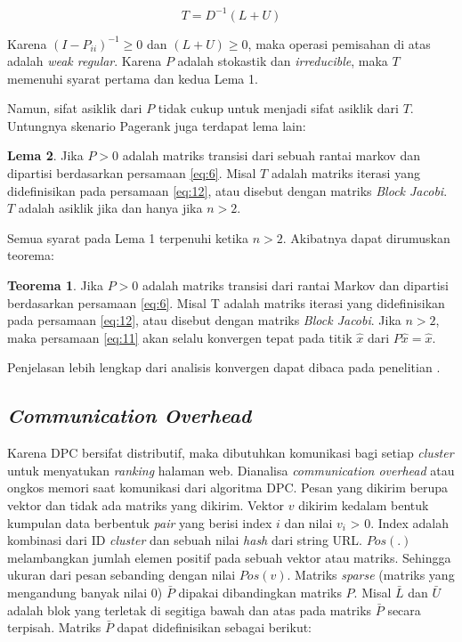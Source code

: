 \begin{equation}
	\label{eq:12}
	T = D^{-1}(L+U)
\end{equation}

Karena $(I - P_{ii})^{-1} \geq 0$ dan $(L + U) \geq 0$, maka operasi pemisahan di atas adalah \textit{weak regular}. Karena $P$ adalah stokastik dan \textit{irreducible}, maka $T$ memenuhi syarat pertama dan kedua Lema 1.

Namun, sifat asiklik dari $P$ tidak cukup untuk menjadi sifat asiklik dari $T$. Untungnya skenario Pagerank juga terdapat lema lain:

\textbf{Lema 2}. Jika $P > 0$ adalah matriks transisi dari sebuah rantai markov dan dipartisi berdasarkan persamaan \ref{eq:6}. Misal $T$ adalah matriks iterasi yang didefinisikan pada persamaan \ref{eq:12}, atau disebut dengan matriks \textit{Block Jacobi}. $T$ adalah asiklik jika dan hanya jika $n > 2$.

Semua syarat pada Lema 1 terpenuhi ketika $n > 2$. Akibatnya dapat dirumuskan teorema:

\textbf{Teorema 1}. Jika $P > 0$ adalah matriks transisi dari rantai Markov dan dipartisi berdasarkan persamaan \ref{eq:6}. Misal T adalah matriks iterasi yang didefinisikan pada persamaan \ref{eq:12}, atau disebut dengan matriks \textit{Block Jacobi}. Jika $n > 2$, maka persamaan \ref{eq:11} akan selalu konvergen tepat pada titik $\hat{x}$ dari $P\hat{x} = \hat{x}$. 

Penjelasan lebih lengkap dari analisis konvergen dapat dibaca pada penelitian \citet{zhuetal2005distributedPagerank}.

\subsection{\textit{Communication Overhead}}

Karena DPC bersifat distributif, maka dibutuhkan komunikasi bagi setiap \textit{cluster} untuk menyatukan \textit{ranking} halaman web. Dianalisa \textit{communication overhead} atau ongkos memori saat komunikasi dari algoritma DPC. Pesan yang dikirim berupa vektor dan tidak ada matriks yang dikirim. Vektor $v$ dikirim kedalam bentuk kumpulan data berbentuk \textit{pair} yang berisi index $i$ dan nilai $v_i$ > 0. Index adalah kombinasi dari ID \textit{cluster} dan sebuah nilai \textit{hash} dari string URL. $Pos(.)$ melambangkan jumlah elemen positif pada sebuah vektor atau matriks. Sehingga ukuran dari pesan sebanding dengan nilai $Pos(v)$. Matriks \textit{sparse} (matriks yang mengandung banyak nilai 0) $\bar{P}$ dipakai dibandingkan matriks $P$. Misal $\bar{L}$ dan $\bar{U}$ adalah blok yang terletak di segitiga bawah dan atas pada matriks $\bar{P}$ secara terpisah. Matriks $\bar{P}$ dapat didefinisikan sebagai berikut:


